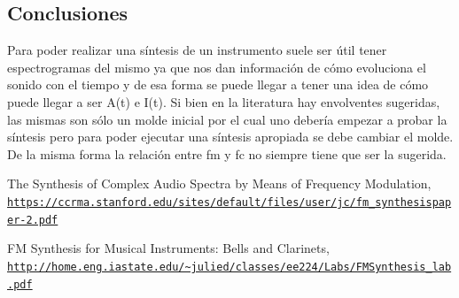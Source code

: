 \documentclass[assd_tp2_main.tex]{subfiles}
\begin{document}
\subsection{Conclusiones}
Para poder realizar una síntesis de un instrumento suele ser útil tener espectrogramas del mismo ya que nos dan información de cómo evoluciona el sonido con el tiempo y de esa forma se puede llegar a tener una idea de cómo puede llegar a ser A(t) e I(t). Si bien en la literatura hay envolventes sugeridas, las mismas son sólo un molde inicial por el cual uno debería empezar a probar la síntesis pero para poder ejecutar una síntesis apropiada se debe cambiar el molde. De la misma forma la relación entre fm y fc no siempre tiene que ser la sugerida. 
\begin{thebibliography}{9}
  
The Synthesis of Complex Audio Spectra by Means of Frequency Modulation,
\\\texttt{\url{https://ccrma.stanford.edu/sites/default/files/user/jc/fm_synthesispaper-2.pdf}}

FM Synthesis for Musical Instruments: Bells and Clarinets,
\\\texttt{\url{http://home.eng.iastate.edu/~julied/classes/ee224/Labs/FMSynthesis_lab.pdf}}

\end{thebibliography}
\end{document}
